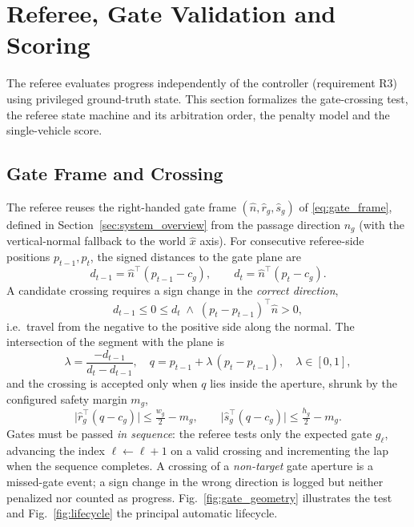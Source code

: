 \section{Referee, Gate Validation and Scoring}
\label{sec:referee}

The referee evaluates progress independently of the controller (requirement R3) using privileged ground-truth state. This section formalizes the gate-crossing test, the referee state machine and its arbitration order, the penalty model and the single-vehicle score.

\subsection{Gate Frame and Crossing}

The referee reuses the right-handed gate frame $(\hat{n},\hat{r}_g,\hat{s}_g)$ of \eqref{eq:gate_frame}, defined in Section~\ref{sec:system_overview} from the passage direction $n_g$ (with the vertical-normal fallback to the world $\hat{x}$ axis). For consecutive referee-side positions $p_{t-1},p_t$, the signed distances to the gate plane are
\begin{equation}
\label{eq:signed_dist}
d_{t-1}=\hat{n}^{\!\top}(p_{t-1}-c_g),\qquad d_t=\hat{n}^{\!\top}(p_t-c_g).
\end{equation}
A candidate crossing requires a sign change in the \emph{correct direction},
\begin{equation}
\label{eq:direction}
d_{t-1}\le 0\le d_t \;\wedge\; (p_t-p_{t-1})^{\!\top}\hat{n}>0,
\end{equation}
i.e.\ travel from the negative to the positive side along the normal. The intersection of the segment with the plane is
\begin{equation}
\label{eq:intersection}
\lambda=\frac{-d_{t-1}}{d_t-d_{t-1}},\quad q=p_{t-1}+\lambda\,(p_t-p_{t-1}),\quad \lambda\in[0,1],
\end{equation}
and the crossing is accepted only when $q$ lies inside the aperture, shrunk by the configured safety margin $m_g$,
\begin{equation}
\label{eq:aperture}
\big|\hat{r}_g^{\!\top}(q-c_g)\big|\le \tfrac{w_g}{2}-m_g,\qquad
\big|\hat{s}_g^{\!\top}(q-c_g)\big|\le \tfrac{h_g}{2}-m_g.
\end{equation}
Gates must be passed \emph{in sequence}: the referee tests only the expected gate $g_{\ell}$, advancing the index $\ell\!\leftarrow\!\ell+1$ on a valid crossing and incrementing the lap when the sequence completes. A crossing of a \emph{non-target} gate aperture is a missed-gate event; a sign change in the wrong direction is logged but neither penalized nor counted as progress. Fig.~\ref{fig:gate_geometry} illustrates the test and Fig.~\ref{fig:lifecycle} the principal automatic lifecycle.

